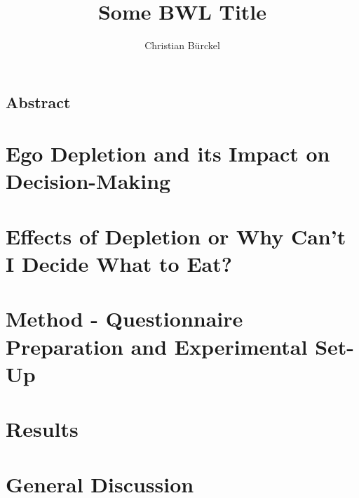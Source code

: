 
\author{Christian Bürckel}
\title{Some BWL Title}




\maketitle
%
 \thispagestyle{plain} %
 \clearpage
 \thispagestyle{empty}
 \mbox{}
 \clearpage
 \pagestyle{bib} %
 \tableofcontents
 \clearpage
 \pagestyle{abstract}
 \section*{Abstract}
  
 \clearpage
 \pagestyle{main}
 \chapter{Ego Depletion and its Impact on Decision-Making}
  
 \chapter{Effects of Depletion or Why Can't I Decide What to Eat?}\label{chap:effectsofegodepletion}
  
 \chapter{Method - Questionnaire Preparation and Experimental Set-Up}
 
 \chapter{Results}
 
 \chapter{General Discussion}
 
%
\clearpage
\pagestyle{bib}
%
%


